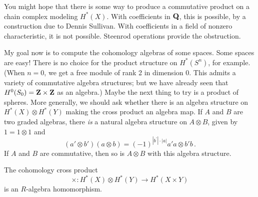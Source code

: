 You might hope that there is some way to produce a commutative product on 
a chain complex modeling $H^\ast(X)$. With coefficients in $\mathbf Q$, this is 
possible, by a construction due to Dennis Sullivan. 
With coefficients in a field of nonzero characteristic, it is not possible.
Steenrod operations provide the obstruction.

My goal now is to compute the cohomology algebras of some spaces. 
Some spaces are
easy! There is no choice for the product structure on $H^*(S^n)$, for example.
(When $n=0$, we get a free module of rank 2 in dimension 0. This admits
a variety of commutative algebra structures; but we have already seen that
$H^0(S_0)=\mathbf Z\times\mathbf Z$ as an algebra.) Maybe the next thing to try is a 
product of spheres. More generally, we should ask whether there is an 
algebra structure on $H^\ast(X)\otimes H^\ast(Y)$ making the cross product an
algebra map. If $A$ and $B$ are two graded algebras, there {\em is} a natural
algebra structure on $A\otimes B$, given by $1=1\otimes1$ and
\[
(a'\otimes b')(a\otimes b)=(-1)^{|b^\prime|\cdot|a|}a'a\otimes b'b\,.
\]
If $A$ and $B$ are commutative, then so is $A\otimes B$ with this algebra
structure. 
\begin{prop} The cohomology cross product
\[
\times:H^\ast(X)\otimes H^\ast(Y)\rightarrow H^\ast(X\times Y)
\]
is an $R$-algebra homomorphism.
\end{prop}

